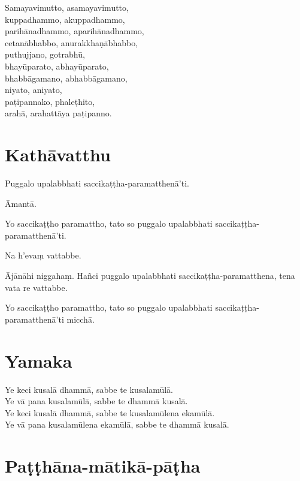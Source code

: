 Samayavimutto, asamayavimutto,\\
kuppadhammo, akuppadhammo,\\
parihānadhammo, aparihānadhammo,\\
cetanābhabbo, anurakkhaṇābhabbo,\\
puthujjano, gotrabhū,\\
bhayūparato, abhayūparato,\\
bhabbāgamano, abhabbāgamano,\\
niyato, aniyato,\\
paṭipannako, phaleṭhito,\\
arahā, arahattāya paṭipanno. 


\section{Kathāvatthu}

Puggalo upalabbhati saccikaṭṭha-paramatthenā'ti.

Āmantā.

Yo saccikaṭṭho paramattho, tato so puggalo upalabbhati
saccikaṭṭha-paramatthenā'ti.

Na h’evaṃ vattabbe.

Ājānāhi niggahaṃ. Hañci puggalo upalabbhati
saccikaṭṭha-paramatthena, tena vata re vattabbe.

Yo saccikaṭṭho paramattho, tato so puggalo upalabbhati
saccikaṭṭha-paramatthenā'ti micchā.



\section{Yamaka}

Ye keci kusalā dhammā, sabbe te kusalamūlā.\\ 
Ye vā pana kusalamūlā, sabbe te dhammā kusalā.\\
Ye keci kusalā dhammā, sabbe te kusalamūlena ekamūlā.\\ 
Ye vā pana kusalamūlena ekamūlā, sabbe te dhammā kusalā.



\section{Paṭṭhāna-mātikā-pāṭha}

